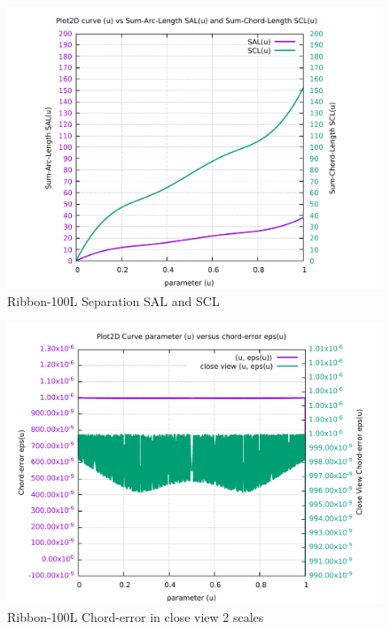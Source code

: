 \begin{figure}
	\caption     {Ribbon-100L Separation SAL and SCL}
	\label{08-img-Ribbon-100L-Separation-SAL-and-SCL.pdf}
\includegraphics[width=1.00\textwidth]{Chap4/appendix/app-Ribbon-100L/plots/08-img-Ribbon-100L-Separation-SAL-and-SCL.pdf}
\end{figure}

\clearpage
\pagebreak

\begin{figure}
	\caption     {Ribbon-100L Chord-error in close view 2 scales}
	\label{09-img-Ribbon-100L-Chord-error-in-close-view-2-scales.pdf}
\includegraphics[width=1.00\textwidth]{Chap4/appendix/app-Ribbon-100L/plots/09-img-Ribbon-100L-Chord-error-in-close-view-2-scales.pdf}
\end{figure}

